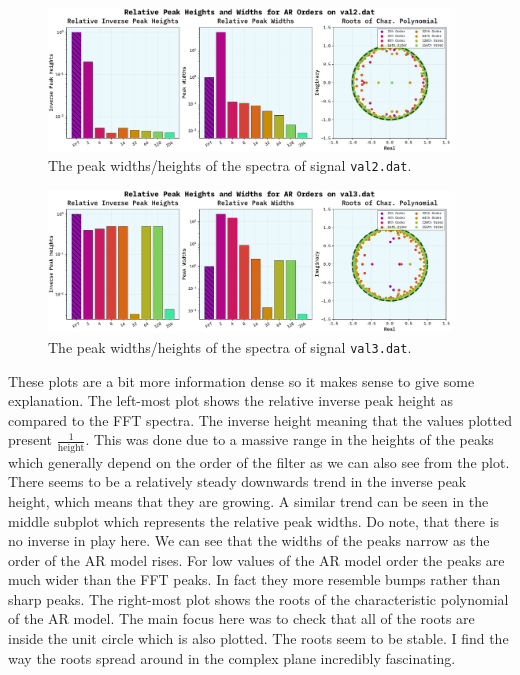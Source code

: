 \documentclass[10pt, titlepage, a4paper]{article}
\begin{document}
\begin{figure}[H]
    \centering
    \includegraphics[width=0.95\textwidth]{../MaxEntropy/Images/peak-widths-val2.dat.pdf}
    \caption{The peak widths/heights of the spectra of signal \texttt{val2.dat}.}
    \label{fig:width-1}
\end{figure}

\begin{figure}[H]
    \centering
    \includegraphics[width=0.95\textwidth]{../MaxEntropy/Images/peak-widths-val3.dat.pdf}
    \caption{The peak widths/heights of the spectra of signal \texttt{val3.dat}.}
    \label{fig:width-2}
\end{figure}

These plots are a bit more information dense so it makes sense to give some explanation. The left-most plot shows the relative 
inverse peak height as compared to the FFT spectra. The inverse height meaning that the values plotted present 
$\frac{1}{\text{height}}$. This was done due to a massive range in the heights of the peaks which generally depend on the order 
of the filter as we can also see from the plot. There seems to be a relatively steady downwards trend in the inverse peak height, which 
means that they are growing. A similar trend can be seen in the middle subplot which represents the relative peak widths. Do note, that 
there is no inverse in play here. We can see that the widths of the peaks narrow as the order of the AR model rises. For low 
values of the AR model order the peaks are much wider than the FFT peaks. In fact they more resemble bumps rather than 
sharp peaks. The right-most plot shows the roots of the characteristic polynomial of the AR model. The main focus here was to check 
that all of the roots are inside the unit circle which is also plotted. The roots seem to be stable. I find the way the roots spread around 
in the complex plane incredibly fascinating. \\
\end{document}
